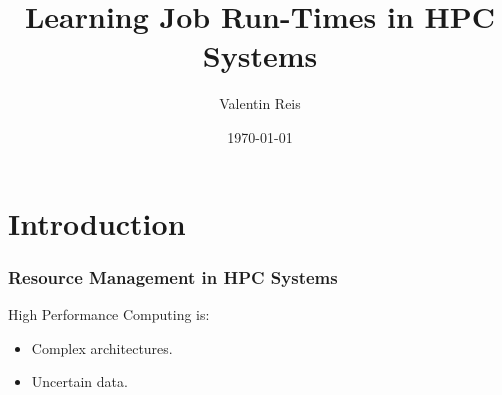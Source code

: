 \documentclass{beamer}
\title[Learning Job Run-Times in HPC Systems]{Learning Job Run-Times in HPC Systems} %
\author{Valentin Reis} %
\institute[LIG AMA] %
{
  LIG, AMA Team.\\ %
  Under supervision of: Eric Gaussier and Denis Trystram. \\
  \medskip
}
\date{\today} %
\begin{document}
\begin{frame}
  \titlepage %
\end{frame}



\section{Introduction}
\label{sec:introduction}

\label{sub:scheduling_in_hpc_systems}

\begin{frame}
  \frametitle{Resource Management in HPC Systems}

  High Performance Computing is:
  \centering

    \hfill
    \parbox{.70\textwidth}{
      \begin{itemize}
    \item Complex architectures.
    \item Uncertain data.
      \end{itemize}}

\end{frame}
\end{document}
